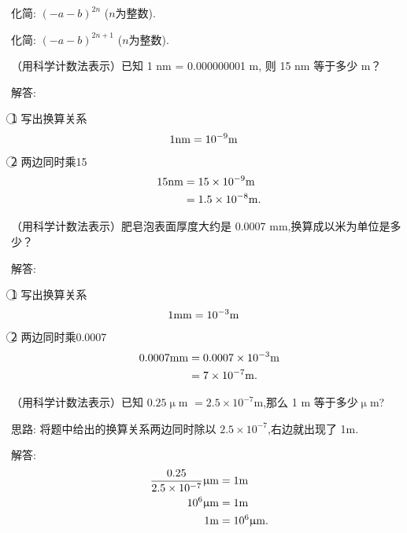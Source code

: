 \item{
    化简: $(-a-b)^{2n}$ ($n$为整数).
}
\item{
    化简: $(-a-b)^{2n+1}$ ($n$为整数).
}
\item{
    （用科学计数法表示）已知 1 nm = 0.000000001 m, 则 15 nm 等于多少 m？

    \fangsong{}
    解答: 

    \textcircled{1} 写出换算关系
    \begin{align*}
        1 \rm{nm} &= 10^{-9} \rm{m}
    \end{align*}
    \textcircled{2} 两边同时乘15
    \begin{align*}
        15 \rm{nm} &= 15 \times 10^{-9} \rm{m}\\
        &= 1.5\times 10^{-8} \rm{m}.
    \end{align*}
}
\item{
    （用科学计数法表示）肥皂泡表面厚度大约是 0.0007 mm,换算成以米为单位是多少？

    \fangsong{}
    解答: 

    \textcircled{1} 写出换算关系
    \begin{align*}
        1 \rm{mm} &= 10^{-3} \rm{m}
    \end{align*}
    \textcircled{2} 两边同时乘0.0007
    \begin{align*}
        0.0007 \rm{mm} &= 0.0007 \times 10^{-3} \rm{m}\\
        &= 7\times 10^{-7} \rm{m}.
    \end{align*}
}
\item{
    （用科学计数法表示）已知 $0.25 \upmu$m $ = 2.5\times 10^{-7}$m,那么 1 m 等于多少$\upmu$m?

    \fangsong{}
    思路: 将题中给出的换算关系两边同时除以 $2.5\times 10^{-7}$,右边就出现了 1m.

    解答: 
    \begin{align*}
        \frac{0.25}{2.5\times 10^{-7}} \rm{\upmu m} &= 1\rm{m}\\
        10^6 \rm{\upmu m} &= 1\rm{m}\\
        1\rm{m} &= 10^6 \rm{\upmu m}.
    \end{align*}
}
